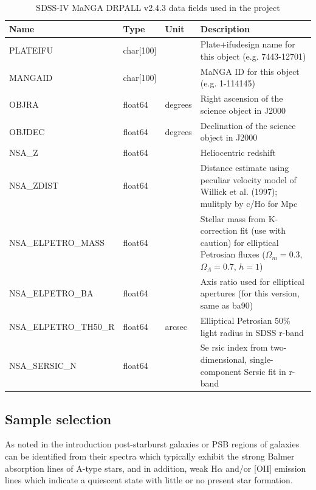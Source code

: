 \begin{table}
\caption[MaNGA DRPALL fields used in the project]{SDSS-IV MaNGA DRPALL v2.4.3 data fields used in the project}
\label{tab:DRPall-table}
\begin{tabular}{|p{3.2cm}|p{1.2cm}||p{1cm}|p{10cm}|}
\hline
Name & Type & Unit & Description \\
\hline
PLATEIFU & char{[}100{]} &  & Plate+ifudesign name for this object (e.g. 7443-12701)\\
MANGAID & char{[}100{]} & & MaNGA ID for this object (e.g. 1-114145)\\
OBJRA & float64 & degrees & Right ascension of the science object in J2000\\
OBJDEC & float64 & degrees & Declination of the science object in J2000\\
NSA\_Z & float64 &  & Heliocentric redshift\\
NSA\_ZDIST & float64 &  & Distance estimate using peculiar velocity model of Willick et al. (1997); mulitply by c/Ho for Mpc\\
NSA\_ELPETRO\_MASS & float64 &  & Stellar mass from K-correction fit (use with caution) for elliptical Petrosian fluxes ($\Omega_m=0.3$, $\Omega_\Lambda=0.7$, $h=1$)\\
NSA\_ELPETRO\_BA & float64 &  & Axis ratio used for elliptical apertures (for this version, same as ba90)\\
NSA\_ELPETRO\_TH50\_R & float64 & arcsec & Elliptical Petrosian 50\% light radius in SDSS r-band\\
NSA\_SERSIC\_N & float64 &  & Se
rsic index from two-dimensional, single-component Sersic fit in r-band\\
\hline
\end{tabular}
\end{table}

\subsection{Sample selection}
As noted in the introduction post-starburst galaxies or PSB regions of galaxies can be identified from their spectra which typically exhibit the strong Balmer absorption lines of A-type stars, and in addition, weak H$\alpha$ and/or [OII] emission lines which indicate a quiescent state with little or no present star formation. 

